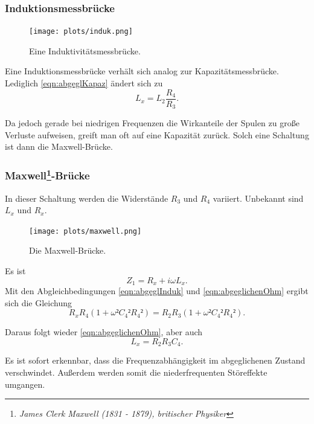 \subsubsection{Induktionsmessbrücke}

\begin{figure}
    \centering
    \texttt{[image: plots/induk.png]}
    \caption{Eine Induktivitätsmessbrücke.}
    \label{fig:induk}
\end{figure}

Eine Induktionsmessbrücke verhält sich analog zur Kapazitätsmessbrücke.
Lediglich \ref{eqn:abgeglKapaz} ändert sich zu 
\begin{equation}
    L_x = L_2\frac{R_4}{R_3} .
    \label{eqn:abgeglInduk}  
\end{equation}

Da jedoch gerade bei niedrigen Frequenzen die Wirkanteile der Spulen zu große Verluste aufweisen, greift man oft auf eine Kapazität zurück.
Solch eine Schaltung ist dann die Maxwell-Brücke.

\subsubsection{Maxwell\footnote{\textit{James Clerk Maxwell (1831 - 1879), britischer Physiker}}-Brücke}
In dieser Schaltung werden die Widerstände $R_3$ und $R_4$ variiert.
Unbekannt sind $L_x$ und $R_x$.
\begin{figure}
    \centering
    \texttt{[image: plots/maxwell.png]}
    \caption{Die Maxwell-Brücke.}
    \label{fig:maxell}
\end{figure}
Es ist 
\begin{equation*}
    Z_1 = R_x + i\omega L_x .
\end{equation*}
Mit den Abgleichbedingungen \ref{eqn:abgeglInduk} und \ref{eqn:abgeglichenOhm} ergibt sich die Gleichung
\begin{equation*}
    R_xR_4(1+\omega ²C_4²R_4²) = R_2R_3(1+\omega ²C_4²R_4²) .
\end{equation*}

Daraus folgt wieder \ref{eqn:abgeglichenOhm}, aber auch 
\begin{equation}
    L_x = R_2R_3C_4  .
    \label{eqn:abgeglMaxwell}
\end{equation}

Es ist sofort erkennbar, dass die Frequenzabhängigkeit im abgeglichenen Zustand verschwindet.
Außerdem werden somit die niederfrequenten Störeffekte umgangen.

